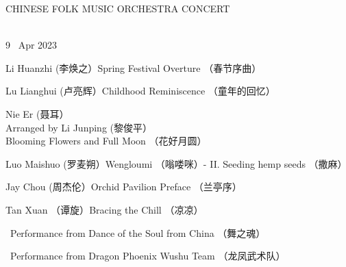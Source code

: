 \documentclass[letter,6pt,poets]{ConcProg}
\begin{document}

 \begin{spacing}{1.0} 
\begin{center}
\Huge{C}\large{HINESE } \Huge{F}\large{OLK} \Huge{M}\large{USIC} \Huge{O}\large{RCHESTRA} \Huge{C}\LARGE{ONCERT}
\end{center}
\begin{programme}{
\\  {\normalsize 9 ~Apr 2023}
}
  \begin{part}[]
    
    
   \begin{composition}{Li Huanzhi (李焕之）}{}{Spring Festival Overture （春节序曲）}{}      
    \end{composition} 
    
    
     \begin{composition}{Lu Lianghui (卢亮辉）}{}{Childhood Reminiscence （童年的回忆）}{}      
    \end{composition} 
    
     \begin{composition}{Nie Er (聂耳）\\ Arranged by Li Junping (黎俊平）}{}{Blooming Flowers and Full Moon （花好月圆）}{}      
    \end{composition} 
    
    \begin{composition}{Luo Maishuo (罗麦朔）}{}{Wengloumi （嗡喽咪）- II. Seeding hemp seeds （撒麻）}{}      
    \end{composition} 
    
    \begin{composition}{Jay Chou (周杰伦）}{}{Orchid Pavilion Preface （兰亭序）}{}      
    \end{composition} 
    
     \begin{composition}{Tan Xuan （谭旋）}{}{Bracing the Chill （凉凉）}{}      
    \end{composition} 
     \begin{composition}{\ }{}{Performance from Dance of the Soul from China （舞之魂）}{}      
    \end{composition} 
    
    \begin{composition}{\ }{}{Performance from Dragon Phoenix Wushu Team （龙凤武术队）}{}      
    \end{composition} 
    

\end{part}
\end{programme}
\end{spacing}
\end{document}
